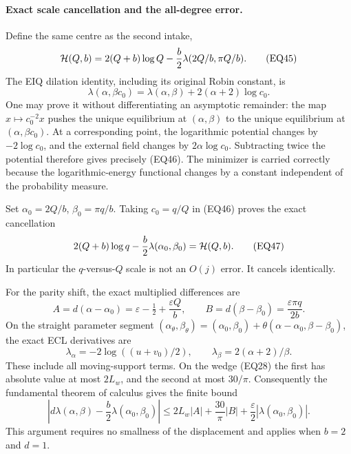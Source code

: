 \paragraph{Exact scale cancellation and the all-degree error.}
Define the same centre as the second intake,
\[
 {\cal H}(Q,b)=2(Q+b)\log Q
      -\frac b2\lambda(2Q/b,\pi Q/b).
\tag{EQ45}
\]
The EIQ dilation identity, including its original Robin constant, is
\[
 \lambda(\alpha,\beta c_0)
   =\lambda(\alpha,\beta)+2(\alpha+2)\log c_0.
\tag{EQ46}
\]
One may prove it without differentiating an asymptotic remainder:
the map \(x\mapsto c_0^{-2}x\) pushes the unique equilibrium at
\((\alpha,\beta)\) to the unique equilibrium at \((\alpha,\beta c_0)\).
At a corresponding point, the logarithmic potential changes by
\(-2\log c_0\), and the external field changes by \(2\alpha\log c_0\).
Subtracting twice the potential therefore gives precisely (EQ46).
The minimizer is carried correctly because the logarithmic-energy
functional changes by a constant independent of the probability measure.

Set
\(\alpha_0=2Q/b\), \(\beta_0=\pi q/b\).
Taking \(c_0=q/Q\) in (EQ46) proves the exact cancellation
\[
 2(Q+b)\log q-\frac b2\lambda(\alpha_0,\beta_0)
       ={\cal H}(Q,b).
\tag{EQ47}
\]
In particular the \(q\)-versus-\(Q\) scale is not an \(O(j)\) error.
It cancels identically.

For the parity shift, the exact multiplied differences are
\[
 A=d(\alpha-\alpha_0)=\varepsilon-\tfrac12+\frac{\varepsilon Q}{b},
 \qquad
 B=d(\beta-\beta_0)=\frac{\varepsilon\pi q}{2b}.
\tag{EQ48}
\]
On the straight parameter segment
\((\alpha_\theta,\beta_\theta)
=(\alpha_0,\beta_0)+\theta(\alpha-\alpha_0,\beta-\beta_0)\),
the exact ECL derivatives are
\[
 \lambda_\alpha=-2\log((u+v_0)/2),\qquad
 \lambda_\beta=2(\alpha+2)/\beta.
\tag{EQ49}
\]
These include all moving-support terms.  On the wedge (EQ28) the first
has absolute value at most \(2L_w\), and the second at most \(30/\pi\).
Consequently the fundamental theorem of calculus gives the finite bound
\[
 \left|d\lambda(\alpha,\beta)-\frac b2\lambda(\alpha_0,\beta_0)\right|
 \le 2L_w|A|+\frac{30}{\pi}|B|
                  +\frac{\varepsilon}{2}|\lambda(\alpha_0,\beta_0)|.
\tag{EQ50}
\]
This argument requires no smallness of the displacement and applies
when \(b=2\) and \(d=1\).

